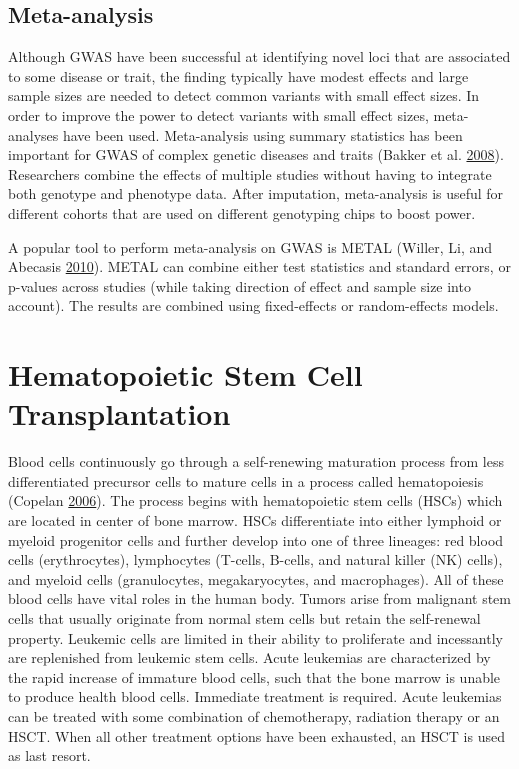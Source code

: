 \documentclass[]{DissertateOSU}
\begin{document}
\subsection{Meta-analysis}\label{meta-analysis}

Although GWAS have been successful at identifying novel loci that are
associated to some disease or trait, the finding typically have modest
effects and large sample sizes are needed to detect common variants with
small effect sizes. In order to improve the power to detect variants
with small effect sizes, meta-analyses have been used. Meta-analysis
using summary statistics has been important for GWAS of complex genetic
diseases and traits (Bakker et al.
\protect\hyperlink{ref-bakker_2008}{2008}). Researchers combine the
effects of multiple studies without having to integrate both genotype
and phenotype data. After imputation, meta-analysis is useful for
different cohorts that are used on different genotyping chips to boost
power.

A popular tool to perform meta-analysis on GWAS is METAL (Willer, Li,
and Abecasis \protect\hyperlink{ref-metal}{2010}). METAL can combine
either test statistics and standard errors, or p-values across studies
(while taking direction of effect and sample size into account). The
results are combined using fixed-effects or random-effects models.

\section{Hematopoietic Stem Cell
Transplantation}\label{hematopoietic-stem-cell-transplantation}

Blood cells continuously go through a self-renewing maturation process
from less differentiated precursor cells to mature cells in a process
called hematopoiesis (Copelan
\protect\hyperlink{ref-copelan_2006}{2006}). The process begins with
hematopoietic stem cells (HSCs) which are located in center of bone
marrow. HSCs differentiate into either lymphoid or myeloid progenitor
cells and further develop into one of three lineages: red blood cells
(erythrocytes), lymphocytes (T-cells, B-cells, and natural killer (NK)
cells), and myeloid cells (granulocytes, megakaryocytes, and
macrophages). All of these blood cells have vital roles in the human
body. Tumors arise from malignant stem cells that usually originate from
normal stem cells but retain the self-renewal property. Leukemic cells
are limited in their ability to proliferate and incessantly are
replenished from leukemic stem cells. Acute leukemias are characterized
by the rapid increase of immature blood cells, such that the bone marrow
is unable to produce health blood cells. Immediate treatment is
required. Acute leukemias can be treated with some combination of
chemotherapy, radiation therapy or an HSCT. When all other treatment
options have been exhausted, an HSCT is used as last resort.
\end{document}
